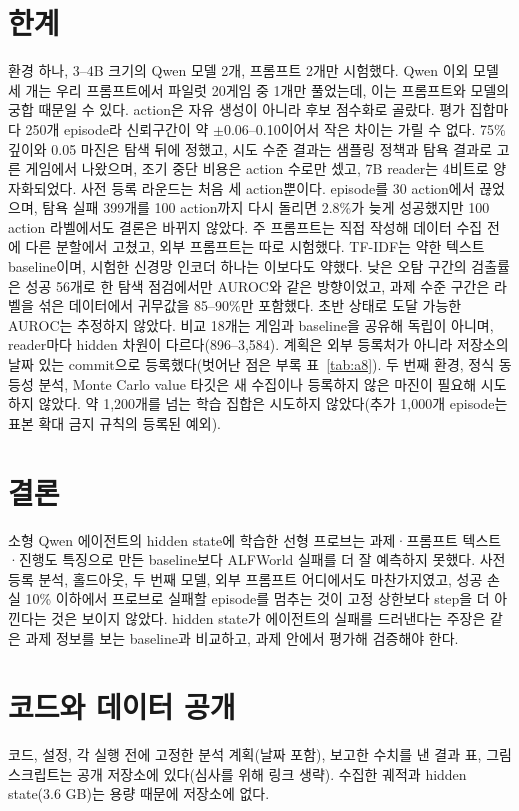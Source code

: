 \documentclass[10pt]{article}
\begin{document}
\section{한계}\label{sec:limits}
환경 하나, 3--4B 크기의 Qwen 모델 2개, 프롬프트 2개만 시험했다. Qwen 이외 모델 세 개는 우리 프롬프트에서 파일럿 20게임 중 1개만 풀었는데, 이는 프롬프트와 모델의 궁합 때문일 수 있다. action은 자유 생성이 아니라 후보 점수화로 골랐다.
평가 집합마다 250개 episode라 신뢰구간이 약 $\pm$0.06--0.10이어서 작은 차이는 가릴 수 없다. 75\% 깊이와 0.05 마진은 탐색 뒤에 정했고, 시도 수준 결과는 샘플링 정책과 탐욕 결과로 고른 게임에서 나왔으며, 조기 중단 비용은 action 수로만 셌고, 7B reader는 4비트로 양자화되었다.
사전 등록 라운드는 처음 세 action뿐이다. episode를 30 action에서 끊었으며, 탐욕 실패 399개를 100 action까지 다시 돌리면 2.8\%가 늦게 성공했지만 100 action 라벨에서도 결론은 바뀌지 않았다. 주 프롬프트는 직접 작성해 데이터 수집 전에 다른 분할에서 고쳤고, 외부 프롬프트는 따로 시험했다.
TF-IDF는 약한 텍스트 baseline이며, 시험한 신경망 인코더 하나는 이보다도 약했다. 낮은 오탐 구간의 검출률은 성공 56개로 한 탐색 점검에서만 AUROC와 같은 방향이었고, 과제 수준 구간은 라벨을 섞은 데이터에서 귀무값을 85--90\%만 포함했다. 초반 상태로 도달 가능한 AUROC는 추정하지 않았다. 비교 18개는 게임과 baseline을 공유해 독립이 아니며, reader마다 hidden 차원이 다르다(896--3,584). 계획은 외부 등록처가 아니라 저장소의 날짜 있는 commit으로 등록했다(벗어난 점은 부록 표~\ref{tab:a8}). 두 번째 환경, 정식 동등성 분석, Monte Carlo value 타깃은 새 수집이나 등록하지 않은 마진이 필요해 시도하지 않았다. 약 1,200개를 넘는 학습 집합은 시도하지 않았다(추가 1,000개 episode는 표본 확대 금지 규칙의 등록된 예외).

\section{결론}
소형 Qwen 에이전트의 hidden state에 학습한 선형 프로브는 과제·프롬프트 텍스트·진행도 특징으로 만든 baseline보다 ALFWorld 실패를 더 잘 예측하지 못했다. 사전 등록 분석, 홀드아웃, 두 번째 모델, 외부 프롬프트 어디에서도 마찬가지였고, 성공 손실 10\% 이하에서 프로브로 실패할 episode를 멈추는 것이 고정 상한보다 step을 더 아낀다는 것은 보이지 않았다.
hidden state가 에이전트의 실패를 드러낸다는 주장은 같은 과제 정보를 보는 baseline과 비교하고, 과제 안에서 평가해 검증해야 한다.

\section*{코드와 데이터 공개}
코드, 설정, 각 실행 전에 고정한 분석 계획(날짜 포함), 보고한 수치를 낸 결과 표, 그림 스크립트는 공개 저장소에 있다(심사를 위해 링크 생략). 수집한 궤적과 hidden state(3.6 GB)는 용량 때문에 저장소에 없다.
\end{document}
